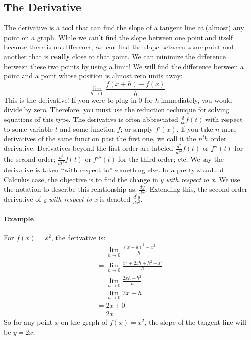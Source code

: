 \documentclass[../main.tex]{subfiles}
\begin{document}
\subsection{The Derivative}
\par The derivative is a tool that can find the slope of a tangent line at (almost) any point on a graph. While we can't find the slope between one point and itself because there is no difference, we can find the slope between some point and another that is \textbf{really} close to that point. We can minimize the difference between these two points by using a limit! We will find the difference between a point and a point whose position is almost zero units away: $$\lim_{h\to 0} \frac{f(x+h)-f(x)}{h}$$ This is the derivative! If you were to plug in 0 for $h$ immediately, you would divide by zero. Therefore, you must use the reduction technique for solving equations of this type. The derivative is often abbreviated $\displaystyle\frac{d}{dt} f(t)$ with respect to some variable $t$ and some function $f$; or simply $f'(x)$. If you take $n$ more derivatives of the same function past the first one, we call it the $n^th$ order derivative. Derivatives beyond the first order are labeled $\displaystyle\frac{d^2}{dt^2} f(t)$ or $f''(t)$ for the second order; $\displaystyle\frac{d^3}{dt^3} f(t)$ or $f'''(t)$ for the third order; etc. We say the derivative is taken ``with respect to'' something else. In a pretty standard Calculus case, the objective is to find the change in  \textit{y with respect to x}. We use the notation to describe this relationship as: $\displaystyle\frac{dy}{dx}$. Extending this, the second order derivative of \textit{y with respect to x} is denoted $\displaystyle\frac{d^2y}{dx^2}$.
\paragraph {Example} For $f(x)=x^2$, the derivative is:
\begin{equation}
\begin{split}
&= \lim_{h\to 0} \frac{(x+h)^2-x^2}{h} \\
&= \lim_{h\to 0} \frac{x^2+2xh+h^2-x^2}{h} \\
&= \lim_{h\to 0} \frac{2xh+h^2}{h} \\
&= \lim_{h\to 0} 2x+h \\
&= 2x+0 \\
&= 2x
\end{split}
\end{equation}
So for any point $x$ on the graph of $f(x)=x^2$, the slope of the tangent line will be $y=2x$.
\end{document}
